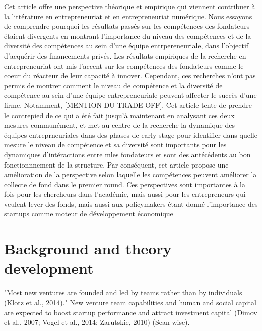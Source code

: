 \documentclass[12pt]{article}
\begin{document}
Cet article offre une perspective théorique et empirique qui viennent contribuer à la littérature en entrepreneuriat et en entrepreneuriat numérique. Nous essayons de comprendre pourquoi les résultats passés sur les compétences des fondateurs étaient divergents en montrant l'importance du niveau des compétences et de la diversité des compétences au sein d'une équipe entrpereneuriale, dans l'objectif d'acquérir des financements privés. Les résultats empiriques de la recherche en entrepreneuriat ont mis l'accent sur les compétences des fondateurs comme le coeur du réacteur de leur capacité à innover. Cependant, ces recherches n'ont pas permis de montrer comment le niveau de compétence et la diversité de compétence au sein d'une équipe entrepreneuriale peuvent affecter le succès d'une firme. Notamment, [MENTION DU TRADE OFF]. Cet article tente de prendre le contrepied de ce qui a été fait jusqu'à maintenant en analysant ces deux mesures communément, et met au centre de la recherche la dynamique des équipes entreprneuriales dans des phases de early stage pour identifier dans quelle mesure le niveau de compétence et sa diversité sont importants pour les dynamiques d'intéractions entre mles fondateurs et sont des antécédents au bon fonctionnnement de la structure. Par conséquent, cet article propose une amélioration de la perspective selon laquelle les compétences peuvent améliorer la collecte de fond dans le premier round. Ces perspectives sont importantes à la fois pour les chercheurs dans l'académie, mais aussi pour les entrepreneurs qui veulent lever des fonds, mais aussi aux policymakers étant donné l'importance des startups comme moteur de développement économique

\section{Background and theory development}

"Most new ventures are founded and led by teams rather than by individuals (Klotz et al., 2014)." New venture team capabilities and human and social capital are expected to boost startup performance and attract investment capital (Dimov et al., 2007; Vogel et al., 2014; Zarutskie, 2010) (Sean wise).
\end{document}

